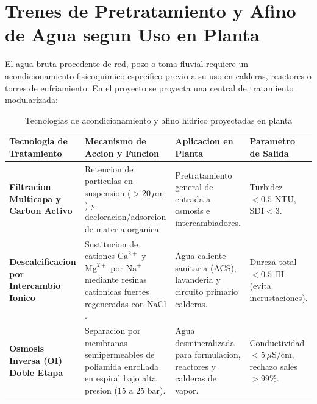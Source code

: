 \documentclass{report}
\begin{document}
\section{Trenes de Pretratamiento y Afino de Agua segun Uso en Planta}

El agua bruta procedente de red, pozo o toma fluvial requiere un acondicionamiento fisicoquimico especifico previo a su uso en calderas, reactores o torres de enfriamiento. En el proyecto se proyecta una central de tratamiento modularizada:



\begin{table}[H]

    \centering

    \small

    \caption{Tecnologias de acondicionamiento y afino hidrico proyectadas en planta}

    \label{tab:trenes_tratamiento}

    \begin{tabularx}{\textwidth}{@{}lXp{4.2cm}l@{}}

        \toprule

        \textbf{Tecnologia de Tratamiento} & \textbf{Mecanismo de Accion y Funcion} & \textbf{Aplicacion en Planta} & \textbf{Parametro de Salida} \\

        \midrule

        \textbf{Filtracion Multicapa y Carbon Activo} & Retencion de particulas en suspension ($> 20\,\mu\text{m}$) y decloracion/adsorcion de materia organica. & Pretratamiento general de entrada a osmosis e intercambiadores. & Turbidez $< 0.5\text{ NTU}$, $\text{SDI} < 3$. \\

        \addlinespace

        \textbf{Descalcificacion por Intercambio Ionico} & Sustitucion de cationes $\text{Ca}^{2+}$ y $\text{Mg}^{2+}$ por $\text{Na}^+$ mediante resinas cationicas fuertes regeneradas con $\text{NaCl}$. & Agua caliente sanitaria (ACS), lavanderia y circuito primario calderas. & Dureza total $< 0.5^\circ\text{fH}$ (evita incrustaciones). \\

        \addlinespace

        \textbf{Osmosis Inversa (OI) Doble Etapa} & Separacion por membranas semipermeables de poliamida enrollada en espiral bajo alta presion ($15\text{ a }25\text{ bar}$). & Agua desmineralizada para formulacion, reactores y calderas de vapor. & Conductividad $< 5\,\mu\text{S/cm}$, rechazo sales $> 99\%$. \\


\end{tabularx}
\end{table}
\end{document}
